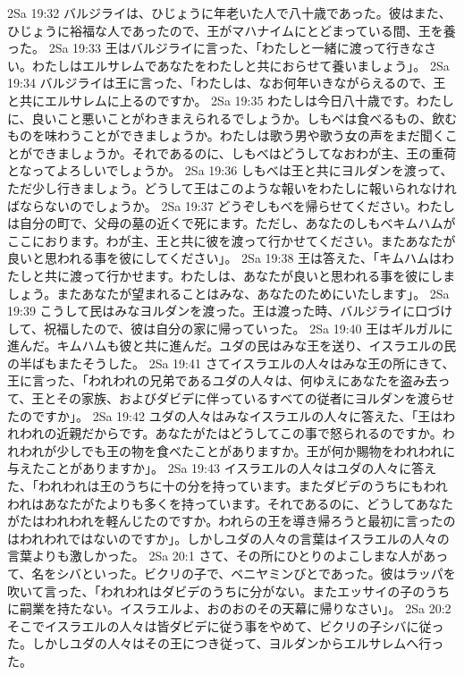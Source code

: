 2Sa 19:32  バルジライは、ひじょうに年老いた人で八十歳であった。彼はまた、ひじょうに裕福な人であったので、王がマハナイムにとどまっている間、王を養った。
2Sa 19:33  王はバルジライに言った、「わたしと一緒に渡って行きなさい。わたしはエルサレムであなたをわたしと共におらせて養いましょう」。
2Sa 19:34  バルジライは王に言った、「わたしは、なお何年いきながらえるので、王と共にエルサレムに上るのですか。
2Sa 19:35  わたしは今日八十歳です。わたしに、良いこと悪いことがわきまえられるでしょうか。しもべは食べるもの、飲むものを味わうことができましょうか。わたしは歌う男や歌う女の声をまだ聞くことができましょうか。それであるのに、しもべはどうしてなおわが主、王の重荷となってよろしいでしょうか。
2Sa 19:36  しもべは王と共にヨルダンを渡って、ただ少し行きましょう。どうして王はこのような報いをわたしに報いられなければならないのでしょうか。
2Sa 19:37  どうぞしもべを帰らせてください。わたしは自分の町で、父母の墓の近くで死にます。ただし、あなたのしもべキムハムがここにおります。わが主、王と共に彼を渡って行かせてください。またあなたが良いと思われる事を彼にしてください」。
2Sa 19:38  王は答えた、「キムハムはわたしと共に渡って行かせます。わたしは、あなたが良いと思われる事を彼にしましょう。またあなたが望まれることはみな、あなたのためにいたします」。
2Sa 19:39  こうして民はみなヨルダンを渡った。王は渡った時、バルジライに口づけして、祝福したので、彼は自分の家に帰っていった。
2Sa 19:40  王はギルガルに進んだ。キムハムも彼と共に進んだ。ユダの民はみな王を送り、イスラエルの民の半ばもまたそうした。
2Sa 19:41  さてイスラエルの人々はみな王の所にきて、王に言った、「われわれの兄弟であるユダの人々は、何ゆえにあなたを盗み去って、王とその家族、およびダビデに伴っているすべての従者にヨルダンを渡らせたのですか」。
2Sa 19:42  ユダの人々はみなイスラエルの人々に答えた、「王はわれわれの近親だからです。あなたがたはどうしてこの事で怒られるのですか。われわれが少しでも王の物を食べたことがありますか。王が何か賜物をわれわれに与えたことがありますか」。
2Sa 19:43  イスラエルの人々はユダの人々に答えた、「われわれは王のうちに十の分を持っています。またダビデのうちにもわれわれはあなたがたよりも多くを持っています。それであるのに、どうしてあなたがたはわれわれを軽んじたのですか。われらの王を導き帰ろうと最初に言ったのはわれわれではないのですか」。しかしユダの人々の言葉はイスラエルの人々の言葉よりも激しかった。
2Sa 20:1  さて、その所にひとりのよこしまな人があって、名をシバといった。ビクリの子で、ベニヤミンびとであった。彼はラッパを吹いて言った、「われわれはダビデのうちに分がない。またエッサイの子のうちに嗣業を持たない。イスラエルよ、おのおのその天幕に帰りなさい」。
2Sa 20:2  そこでイスラエルの人々は皆ダビデに従う事をやめて、ビクリの子シバに従った。しかしユダの人々はその王につき従って、ヨルダンからエルサレムへ行った。
